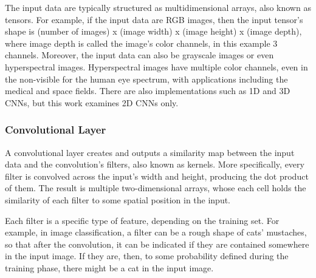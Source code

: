The input data are typically structured as multidimensional arrays, also known as tensors. For example, if the input data are RGB images, then the input tensor's shape is (number of images) x (image width) x (image height) x (image depth), where image depth is called the image's color channels, in this example 3 channels. Moreover, the input data can also be grayscale images or even hyperspectral images. Hyperspectral images have multiple color channels, even in the non-visible for the human eye spectrum, with applications including the medical and space fields. There are also implementations such as 1D and 3D CNNs, but this work examines 2D CNNs only.

\subsubsection{Convolutional Layer}
A convolutional layer creates and outputs a similarity map between the input data and the convolution's filters, also known as kernels. More specifically, every filter is convolved across the input's width and height, producing the dot product of them. The result is multiple two-dimensional arrays, whose each cell holds the similarity of each filter to some spatial position in the input.

Each filter is a specific type of feature, depending on the training set. For example, in image classification, a filter can be a rough shape of cats' mustaches, so that after the convolution, it can be indicated if they are contained somewhere in the input image. If they are, then, to some probability defined during the training phase, there might be a cat in the input image.

